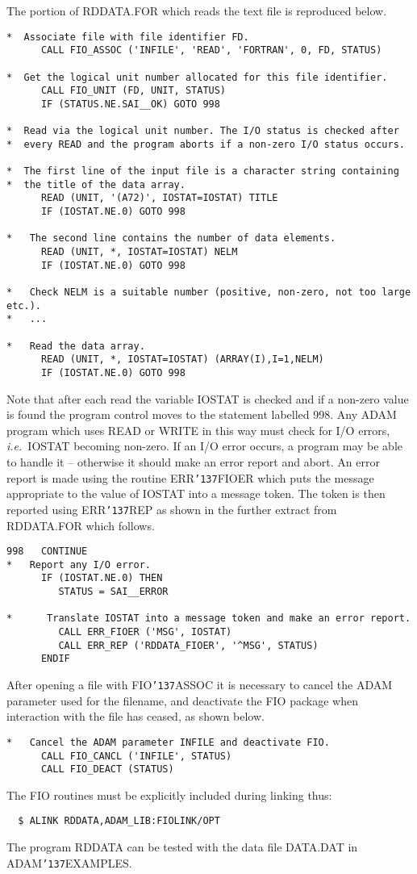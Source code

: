 \documentclass[twoside,11pt]{article}
\renewcommand{\_}{{\tt\char'137}}
\begin{document}
The portion of RDDATA.FOR which reads the text file is reproduced below.
\begin{verbatim}
*  Associate file with file identifier FD.
      CALL FIO_ASSOC ('INFILE', 'READ', 'FORTRAN', 0, FD, STATUS)

*  Get the logical unit number allocated for this file identifier.
      CALL FIO_UNIT (FD, UNIT, STATUS)
      IF (STATUS.NE.SAI__OK) GOTO 998

*  Read via the logical unit number. The I/O status is checked after
*  every READ and the program aborts if a non-zero I/O status occurs.

*  The first line of the input file is a character string containing
*  the title of the data array.
      READ (UNIT, '(A72)', IOSTAT=IOSTAT) TITLE
      IF (IOSTAT.NE.0) GOTO 998

*   The second line contains the number of data elements.
      READ (UNIT, *, IOSTAT=IOSTAT) NELM
      IF (IOSTAT.NE.0) GOTO 998

*   Check NELM is a suitable number (positive, non-zero, not too large etc.).
*   ...

*   Read the data array.
      READ (UNIT, *, IOSTAT=IOSTAT) (ARRAY(I),I=1,NELM)
      IF (IOSTAT.NE.0) GOTO 998
\end{verbatim}
Note that after each read the variable IOSTAT is checked and
if a non-zero value is found the program control moves to the statement
labelled 998.
Any ADAM  program which uses READ or WRITE in this way must check
for I/O errors,  {\it i.e.}\ IOSTAT becoming non-zero.
If an I/O error occurs, a program  may be able to handle it --
otherwise it should make an error report and abort.
An error report is made using the routine ERR\_FIOER which puts
the message appropriate
to the value of IOSTAT into a message token. The token is then
reported using ERR\_REP as shown in the  further extract from RDDATA.FOR
which follows.
\begin{verbatim}
998   CONTINUE
*   Report any I/O error.
      IF (IOSTAT.NE.0) THEN
         STATUS = SAI__ERROR

*      Translate IOSTAT into a message token and make an error report.
         CALL ERR_FIOER ('MSG', IOSTAT)
         CALL ERR_REP ('RDDATA_FIOER', '^MSG', STATUS)
      ENDIF
\end{verbatim}
After opening a file with FIO\_ASSOC it is necessary to cancel the ADAM
parameter used for the filename, and deactivate the FIO package when
interaction with the file
has ceased, as shown below.
\begin{verbatim}
*   Cancel the ADAM parameter INFILE and deactivate FIO.
      CALL FIO_CANCL ('INFILE', STATUS)
      CALL FIO_DEACT (STATUS)
\end{verbatim}
The FIO routines must be explicitly included during linking thus:
\begin{verbatim}
  $ ALINK RDDATA,ADAM_LIB:FIOLINK/OPT
\end{verbatim}
The program RDDATA can be tested with the data file DATA.DAT in
ADAM\_EXAMPLES.
\end{document}
